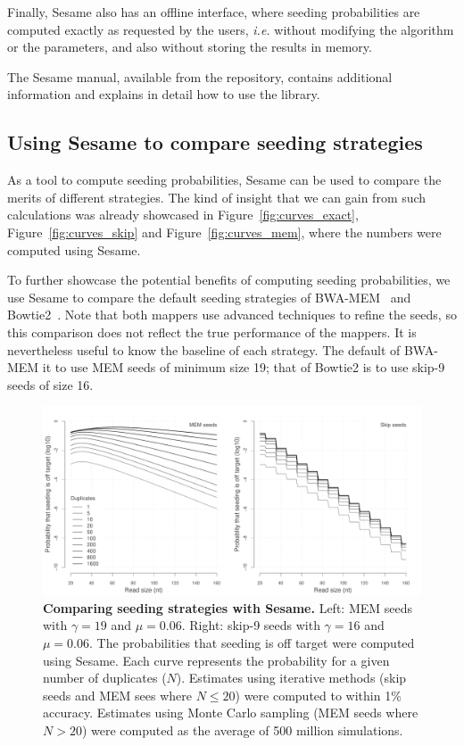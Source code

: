 \documentclass{article}
\begin{document}
Finally, Sesame also has an offline interface, where seeding probabilities
are computed exactly as requested by the users, \textit{i.e.} without
modifying the algorithm or the parameters, and also without storing the
results in memory.

The Sesame manual, available from the repository, contains additional
information and explains in detail how to use the library.


\subsection{Using Sesame to compare seeding strategies}

As a tool to compute seeding probabilities, Sesame can be used to compare
the merits of different strategies. The kind of insight that we can gain
from such calculations was already showcased in
Figure~\ref{fig:curves_exact}, Figure~\ref{fig:curves_skip} and
Figure~\ref{fig:curves_mem}, where the numbers were computed using Sesame.

To further showcase the potential benefits of computing seeding
probabilities, we use Sesame to compare the default seeding strategies of
BWA-MEM~\cite{li2013aligning} and Bowtie2~\cite{pmid22388286}. Note that
both mappers use advanced techniques to refine the seeds, so this
comparison does not reflect the true performance of the mappers. It is
nevertheless useful to know the baseline of each strategy. The default of
BWA-MEM it to use MEM seeds of minimum size 19; that of Bowtie2 is to use
skip-9 seeds of size 16.

\begin{figure}[t]
\begin{center}
\includegraphics[scale=.41]{mortal_kombat.pdf}
\end{center}
\caption{\textbf{Comparing seeding strategies with Sesame.} Left: MEM
seeds with $\gamma=19$ and $\mu=0.06$. Right: skip-9 seeds with
$\gamma=16$ and $\mu=0.06$. The probabilities that seeding is off target
were computed using Sesame. Each curve represents the probability for a
given number of duplicates ($N$). Estimates using iterative methods (skip
seeds and MEM sees where $N \leq 20$) were computed to within 1\%
accuracy. Estimates using Monte Carlo sampling (MEM seeds where $N > 20$)
were computed as the average of 500 million simulations.
}
\label{fig_mortal_kombat}
\end{figure}
\end{document}
